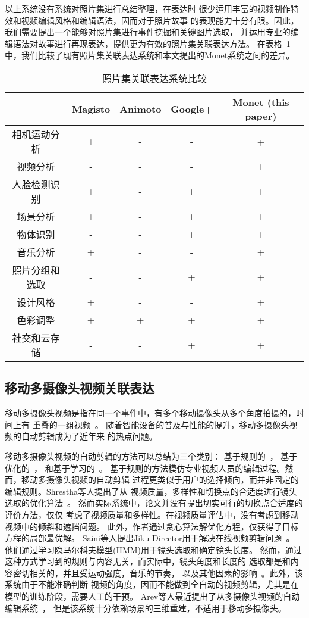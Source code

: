 以上系统没有系统对照片集进行总结整理，在表达时
很少运用丰富的视频制作特效和视频编辑风格和编辑语法，因而对于照片故事
的表现能力十分有限。因此，我们需要提出一个能够对照片集进行事件挖掘和关键图片选取，
并运用专业的编辑语法对故事进行再现表达，提供更为有效的照片集关联表达方法。
在表格~\ref{tab:monet-comp}中，我们比较了现有照片集关联表达系统和本文提出的Monet系统之间的差异。

\begin{table}[htbp]
    \centering
    \caption{照片集关联表达系统比较} \label{tab:monet-comp}
    \begin{tabular}{|c|c|c|c|c|}
    \hline
     & Magisto  & Animoto &  Google+ & Monet (this paper)\\
    \hline
    相机运动分析 & + & - & - & +　 \\
    视频分析    & - & - & - & + \\
    人脸检测识别 & + & - & + & + \\
    场景分析 & + & - & + & + \\
    物体识别 & - & - & + & + \\
    音乐分析 & + & - & - & + \\
    照片分组和选取 & - & - & + & + \\
    设计风格 & + & - & - & + \\
    色彩调整 & + & + & + & + \\
    社交和云存储 & - & - & + & +  \\
    \hline
\end{tabular}
\end{table}
\subsection{移动多摄像头视频关联表达}
移动多摄像头视频是指在同一个事件中，有多个移动摄像头从多个角度拍摄的，时间上有
重叠的一组视频~\cite{DBLP:conf/mm/ShresthaWWBA10}。
随着智能设备的普及与性能的提升，移动多摄像头视频的自动剪辑成为了近年来
的热点问题。

移动多摄像头视频的自动剪辑的方法可以总结为三个类别：
基于规则的~\cite{DBLP:books/daglib/0023820}，
基于优化的~\cite{DBLP:conf/mm/ShresthaWWBA10}，
和基于学习的~\cite{DBLP:conf/mm/NguyenSNO13,DBLP:conf/mm/SainiGYO12}。
基于规则的方法模仿专业视频人员的编辑过程。然而，移动多摄像头视频的自动剪辑
过程更类似于用户的选择倾向，而并非固定的编辑规则。Shrestha等人提出了从
视频质量，多样性和切换点的合适度进行镜头选取的优化算法~\cite{DBLP:conf/mm/ShresthaWWBA10}。
然而实际系统中，论文并没有提出切实可行的切换点合适度的评价方法，仅仅
考虑了视频质量和多样性。在视频质量评估中，没有考虑到移动视频中的倾斜和遮挡问题。
此外，作者通过贪心算法解优化方程，仅获得了目标方程的局部最优解。
Saini等人提出Jiku Director用于解决在线视频剪辑问题~\cite{DBLP:conf/mm/NguyenSNO13,DBLP:conf/mm/SainiGYO12}。
他们通过学习隐马尔科夫模型(HMM)用于镜头选取和确定镜头长度。
然而，通过这种方式学习到的规则与内容无关，而实际中，镜头角度和长度的
选取都是和内容密切相关的，并且受运动强度，音乐的节奏，
以及其他因素的影响~\cite{DBLP:conf/mm/HuaLZ04a}。此外，该系统由于不能准确判断
视频的角度，因而不能做到全自动的视频剪辑，尤其是在模型的训练阶段，需要人工的干预。
Arev等人最近提出了从多摄像头视频的自动编辑系统~\cite{Arev:2014:AEF:2601097.2601198}，
但是该系统十分依赖场景的三维重建，不适用于移动多摄像头。

